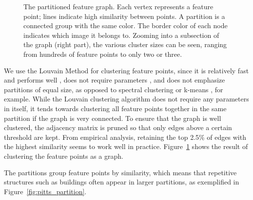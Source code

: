 \begin{figure}[t]
    \centering
{}
    \caption{The partitioned feature graph. Each vertex represents a 
        feature point; lines indicate high similarity between points. A 
        partition is a connected group with the same color. The border 
        color of each node indicates which image it belongs to.  Zooming 
    into a subsection of the graph (right part), the various cluster 
sizes can be seen, ranging from hundreds of feature points to only two 
or three.}
	\label{fig:graph}
\end{figure}

We use the Louvain Method \cite{blondel2008} for clustering feature 
points, since it is relatively fast and performs well 
\cite{lancichinetti2009}, does not require parameters 
\cite{blondel2008}, and does not emphasize partitions of equal size, as 
opposed to spectral clustering or k-means \cite{von2007}, for example.
While the Louvain clustering algorithm does not require any parameters 
in itself, it tends towards clustering all feature points together in 
the same partition if the graph is very connected.  To ensure that the 
graph is well clustered, the adjacency matrix is pruned so that only 
edges above a certain threshold are kept. From empirical analysis, 
retaining the top 2.5\% of edges with the highest similarity seems to 
work well in practice. Figure~\ref{fig:graph} shows the result of 
clustering the feature points as a graph.
%

The partitions group feature points by similarity, which means that 
repetitive structures such as buildings often appear in larger 
partitions, as exemplified in Figure~\ref{fig:pitts_partition}.
%

